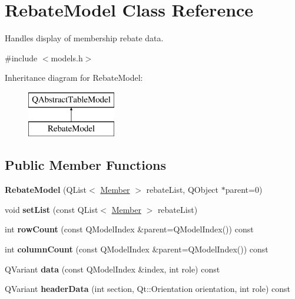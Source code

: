 \hypertarget{class_rebate_model}{}\section{Rebate\+Model Class Reference}
\label{class_rebate_model}


Handles display of membership rebate data.  




{\ttfamily \#include $<$models.\+h$>$}

Inheritance diagram for Rebate\+Model\+:\begin{figure}[H]
\begin{center}
\leavevmode
\includegraphics[height=2.000000cm]{class_rebate_model}
\end{center}
\end{figure}
\subsection*{Public Member Functions}
\begin{DoxyCompactItemize}
\item 
\mbox{\label{class_rebate_model_a3278fc3d74ee40dfae997e9d2c60d9b6}} 
{\bfseries Rebate\+Model} (Q\+List$<$ \mbox{\hyperlink{class_member}{Member}} $>$ rebate\+List, Q\+Object $\ast$parent=0)
\item 
\mbox{\label{class_rebate_model_a2960bd5c48ab50e13044c4b5dad54e51}} 
void {\bfseries set\+List} (const Q\+List$<$ \mbox{\hyperlink{class_member}{Member}} $>$ rebate\+List)
\item 
\mbox{\label{class_rebate_model_a42c40cff636c36d76427d467457ef7af}} 
int {\bfseries row\+Count} (const Q\+Model\+Index \&parent=Q\+Model\+Index()) const
\item 
\mbox{\label{class_rebate_model_a4a05026adaf41bd5547552bedc625fc3}} 
int {\bfseries column\+Count} (const Q\+Model\+Index \&parent=Q\+Model\+Index()) const
\item 
\mbox{\label{class_rebate_model_ae17152e033e90bb828befc1441cb07c0}} 
Q\+Variant {\bfseries data} (const Q\+Model\+Index \&index, int role) const
\item 
\mbox{\label{class_rebate_model_af100ee31b03e861a0766d2834391eabb}} 
Q\+Variant {\bfseries header\+Data} (int section, Qt\+::\+Orientation orientation, int role) const
\end{DoxyCompactItemize}
